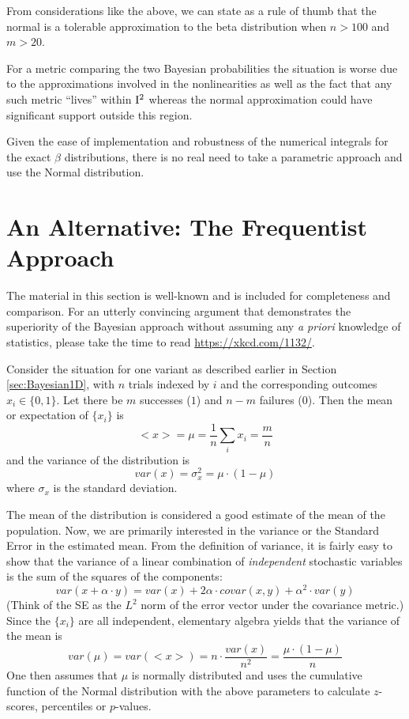 \documentclass[12pt]{report}
\newcommand{\bdm}{\begin{displaymath}} %
\newcommand{\edm}{\end{displaymath}} %
\begin{document}
From considerations like the above, we can state as a rule of thumb
that the normal
is a tolerable approximation to the beta distribution when \(n>100\)
and \(m>20\).

For a metric comparing the two Bayesian probabilities the situation is worse
due to the approximations involved in the nonlinearities as well as the fact
that any such metric ``lives'' within \({\rm I}^2\) whereas the
normal approximation could have significant support outside this region. 

Given the ease of implementation and robustness of the numerical
integrals for the exact \(\beta\) distributions, there is no real need
to take a parametric approach and use the Normal distribution.

\section{An Alternative: The Frequentist Approach\label{sec:frequentist1D}}
The material in this section is well-known and is included for completeness
and comparison. For an utterly convincing argument that demonstrates the
superiority of the Bayesian approach without assuming any {\em a priori}
knowledge of statistics, please take the time to read
\url{https://xkcd.com/1132/}.

Consider the situation for one variant as described earlier in Section
\ref{sec:Bayesian1D}, with \(n\) trials indexed by \(i\) and the corresponding
outcomes \(x_i\in \{0,1\}\). Let there be \(m\) successes (\(1\))
and \(n-m\) failures (\(0\)). Then the mean or expectation of \(\{x_i\}\) is
\bdm
<x> = \mu = \frac{1}{n}\sum_i x_i = \frac{m}{n}
\edm
and the variance of the distribution is
\bdm
var(x) = \sigma^2_x = \mu\cdot(1-\mu)
\edm
where \(\sigma_x\) is the standard deviation.

The mean of the distribution is considered a good estimate of the mean
of the population. Now, we are primarily interested in the variance or the
Standard Error in the estimated mean. From
the definition of variance, it
is fairly easy to show that the variance of a linear combination of
{\em independent} stochastic variables is the sum of the squares of the
components:
\bdm
var(x+\alpha\cdot y) = var(x) + 2\alpha\cdot covar(x,y)+ \alpha^2\cdot var(y)
\edm
(Think of the SE as the \(L^2\) norm of the error vector under the covariance
metric.) Since the \(\{x_i\}\) are all independent, elementary algebra yields
that the variance of the mean is
\bdm
var(\mu) = var(<x>) = n\cdot\frac{var(x)}{n^2} = \frac{\mu\cdot(1-\mu)}{n}
\edm
One then assumes that \(\mu\) is normally distributed and uses the
cumulative function of the Normal distribution with the above parameters to
calculate \(z\)-scores, percentiles or \(p\)-values.
\end{document}
